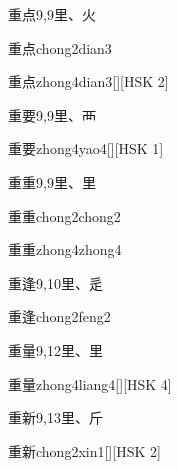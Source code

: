 \begin{entry}{重点}{9,9}{⾥、⽕}
  \begin{phonetics}{重点}{chong2dian3}
  \end{phonetics}
  \begin{phonetics}{重点}{zhong4dian3}[][HSK 2]
  \end{phonetics}
\end{entry}

\begin{entry}{重要}{9,9}{⾥、⾑}
  \begin{phonetics}{重要}{zhong4yao4}[][HSK 1]
  \end{phonetics}
\end{entry}

\begin{entry}{重重}{9,9}{⾥、⾥}
  \begin{phonetics}{重重}{chong2chong2}
  \end{phonetics}
  \begin{phonetics}{重重}{zhong4zhong4}
  \end{phonetics}
\end{entry}

\begin{entry}{重逢}{9,10}{⾥、⾡}
  \begin{phonetics}{重逢}{chong2feng2}
  \end{phonetics}
\end{entry}

\begin{entry}{重量}{9,12}{⾥、⾥}
  \begin{phonetics}{重量}{zhong4liang4}[][HSK 4]
  \end{phonetics}
\end{entry}

\begin{entry}{重新}{9,13}{⾥、⽄}
  \begin{phonetics}{重新}{chong2xin1}[][HSK 2]
  \end{phonetics}
\end{entry}

